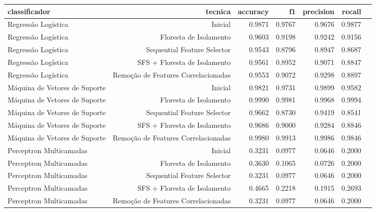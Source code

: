 \begin{tabular}{|l|r|r|r|r|r|r|}
\hline
                 classificador &                              tecnica &  accuracy &      f1 &  precision &  recall \\
\hline
           Regressão Logística &                              Inicial &    0.9871 &  0.9767 &     0.9676 &  0.9877 \\
           Regressão Logística &               Floresta de Isolamento &    0.9603 &  0.9198 &     0.9242 &  0.9156 \\
           Regressão Logística &          Sequential Feature Selector &    0.9543 &  0.8796 &     0.8947 &  0.8687 \\
           Regressão Logística &         SFS + Floresta de Isolamento &    0.9561 &  0.8952 &     0.9071 &  0.8847 \\
           Regressão Logística &  Remoção de Features Correlacionadas &    0.9553 &  0.9072 &     0.9298 &  0.8897 \\
 Máquina de Vetores de Suporte &                              Inicial &    0.9821 &  0.9731 &     0.9899 &  0.9582 \\
 Máquina de Vetores de Suporte &               Floresta de Isolamento &    0.9990 &  0.9981 &     0.9968 &  0.9994 \\
 Máquina de Vetores de Suporte &          Sequential Feature Selector &    0.9662 &  0.8730 &     0.9419 &  0.8541 \\
 Máquina de Vetores de Suporte &         SFS + Floresta de Isolamento &    0.9686 &  0.9000 &     0.9284 &  0.8846 \\
 Máquina de Vetores de Suporte &  Remoção de Features Correlacionadas &    0.9980 &  0.9913 &     0.9986 &  0.9846 \\
       Perceptron Multicamadas &                              Inicial &    0.3231 &  0.0977 &     0.0646 &  0.2000 \\
       Perceptron Multicamadas &               Floresta de Isolamento &    0.3630 &  0.1065 &     0.0726 &  0.2000 \\
       Perceptron Multicamadas &          Sequential Feature Selector &    0.3231 &  0.0977 &     0.0646 &  0.2000 \\
       Perceptron Multicamadas &         SFS + Floresta de Isolamento &    0.4665 &  0.2218 &     0.1915 &  0.2693 \\
       Perceptron Multicamadas &  Remoção de Features Correlacionadas &    0.3231 &  0.0977 &     0.0646 &  0.2000 \\

\end{tabular}
